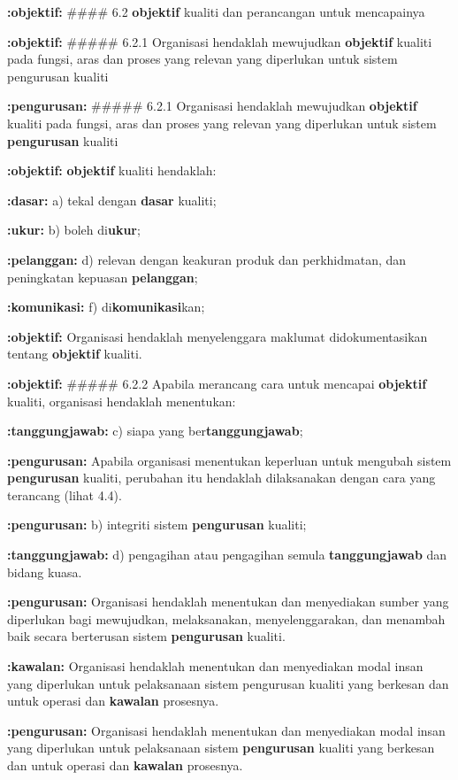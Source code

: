 \documentclass{article}
\begin{document}
\textbf{:objektif:} \#\#\#\# 6.2 \textbf{objektif} kualiti dan perancangan untuk mencapainya

\textbf{:objektif:} \#\#\#\#\# 6.2.1 Organisasi hendaklah mewujudkan \textbf{objektif} kualiti pada fungsi, aras dan proses yang relevan yang diperlukan untuk sistem pengurusan kualiti

\textbf{:pengurusan:} \#\#\#\#\# 6.2.1 Organisasi hendaklah mewujudkan \textbf{objektif} kualiti pada fungsi, aras dan proses yang relevan yang diperlukan untuk sistem \textbf{pengurusan} kualiti

\textbf{:objektif:} \textbf{objektif} kualiti hendaklah:

\textbf{:dasar:} a) tekal dengan \textbf{dasar} kualiti;

\textbf{:ukur:} b) boleh di\textbf{ukur};

\textbf{:pelanggan:} d) relevan dengan keakuran produk dan perkhidmatan, dan peningkatan kepuasan
\textbf{pelanggan};

\textbf{:komunikasi:} f) di\textbf{komunikasi}kan;

\textbf{:objektif:} Organisasi hendaklah menyelenggara maklumat didokumentasikan tentang \textbf{objektif} kualiti.

\textbf{:objektif:} \#\#\#\#\# 6.2.2 Apabila merancang cara untuk mencapai \textbf{objektif} kualiti, organisasi hendaklah menentukan:

\textbf{:tanggungjawab:} c) siapa yang ber\textbf{tanggungjawab};

\textbf{:pengurusan:} Apabila organisasi menentukan keperluan untuk mengubah sistem \textbf{pengurusan} kualiti,
perubahan itu hendaklah dilaksanakan dengan cara yang terancang (lihat 4.4).

\textbf{:pengurusan:} b) integriti sistem \textbf{pengurusan} kualiti;

\textbf{:tanggungjawab:} d) pengagihan atau pengagihan semula \textbf{tanggungjawab} dan bidang kuasa.

\textbf{:pengurusan:} Organisasi hendaklah menentukan dan menyediakan sumber yang diperlukan bagi
mewujudkan, melaksanakan, menyelenggarakan, dan menambah baik secara berterusan
sistem \textbf{pengurusan} kualiti.

\textbf{:kawalan:} Organisasi hendaklah menentukan dan menyediakan modal insan yang diperlukan untuk
pelaksanaan sistem pengurusan kualiti yang berkesan dan untuk operasi dan \textbf{kawalan}
prosesnya.

\textbf{:pengurusan:} Organisasi hendaklah menentukan dan menyediakan modal insan yang diperlukan untuk
pelaksanaan sistem \textbf{pengurusan} kualiti yang berkesan dan untuk operasi dan \textbf{kawalan}
prosesnya.
\end{document}
